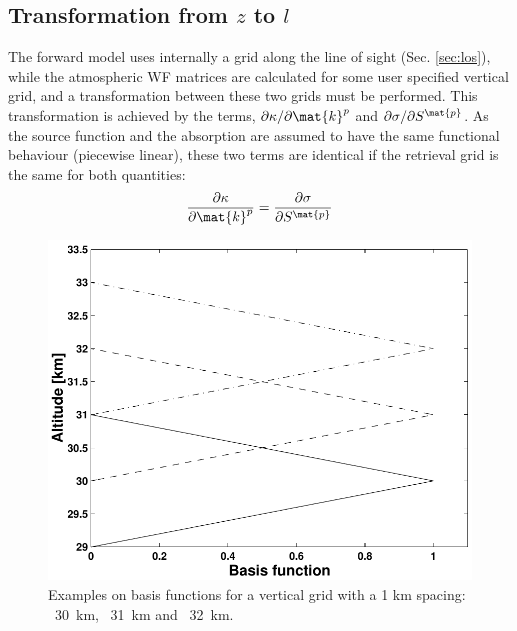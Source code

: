  \subsection{Transformation from $z$ to $l$} 
 The forward model uses
 internally a grid along the line of sight (Sec. \ref{sec:los}), while
 the atmospheric WF matrices are calculated for some user specified
 vertical grid, and a transformation between these two grids must be
 performed. This transformation is achieved by the terms,
 $\partial\kappa/ \partial \mat{k}^p$ and $\partial \sigma / \partial
 S^\mat{p}$. As the source function and the absorption are assumed to
 have the same functional behaviour (piecewise linear), these two
 terms are identical if the retrieval grid is the same for both quantities:
 \begin{equation}
   \frac{\partial \kappa}{\partial \mat{k}^p} =
   \frac{\partial \sigma}{\partial S^\mat{p}}
  \label{eq:wfuns:sandk}
 \end{equation}
 \begin{figure}[t]
  \begin{center}
   \includegraphics*[width=0.7\hsize]{Figs/fig_absbasis_z}
   \caption{Examples on basis functions for a vertical grid with a 1 km
            spacing: \lsolid~30~km, \ldashed~31~km and \ldashdot~32~km.}
   \label{fig:wfuns:zbasis}  
  \end{center}
 \end{figure}
